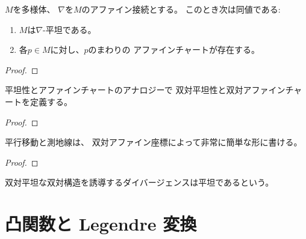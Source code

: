 \documentclass[report]{jlreq}
\begin{document}
\begin{proposition}[アファインチャートの存在]
    $M$を多様体、
    $\nabla$を$M$のアファイン接続とする。
    このとき次は同値である:
    \begin{enumerate}
        \item $M$は$\nabla$-平坦である。
        \item 各$p \in M$に対し、$p$のまわりの
            アファインチャートが存在する。
    \end{enumerate}
\end{proposition}

\begin{proof}
    \TODO{}
\end{proof}

平坦性とアファインチャートのアナロジーで
双対平坦性と双対アファインチャートを定義する。

\begin{definition}[双対平坦]
    \TODO{}
\end{definition}

\begin{definition}[双対アファインチャート]
    \TODO{}
\end{definition}

\begin{proposition}[双対アファインチャートの存在]
    \TODO{}
\end{proposition}

\begin{proof}
    \TODO{}
\end{proof}

平行移動と測地線は、
双対アファイン座標によって非常に簡単な形に書ける。

\begin{proposition}[平行移動と測地線の双対アファイン座標表示]
    \TODO{}
\end{proposition}

\begin{proof}
    \TODO{}
\end{proof}

双対平坦な双対構造を誘導するダイバージェンスは平坦であるという。

\begin{definition}[ダイバージェンスの平坦性]
    \TODO{}
\end{definition}

%
\section{凸関数と Legendre 変換}
\end{document}
